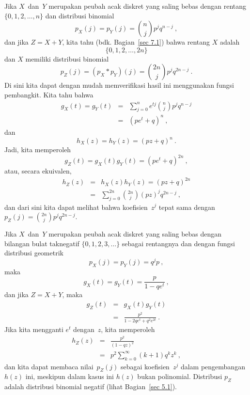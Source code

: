 \begin{example}\label{exam 10.5}
Jika $X$~dan~$Y$ merupakan peubah acak diskret yang saling bebas dengan rentang
$\{0,1,2,\ldots,n\}$ dan distribusi binomial
$$
p_X(j) = p_Y(j) = {n \choose j} p^j q^{n - j}\ ,
$$
dan jika $Z = X + Y$, kita tahu (bdk. Bagian~\ref{sec 7.1}) bahwa rentang $X$ adalah
$$\{0,1,2,\ldots,2n\}$$ 
dan $X$ memiliki distribusi binomial
$$
p_Z(j) = (p_X * p_Y)(j) =
{2n \choose j} p^j q^{2n - j}\ .
$$
Di sini kita dapat dengan mudah memverifikasi hasil ini menggunakan fungsi pembangkit.  Kita tahu
bahwa
\begin{eqnarray*}
g_X(t) = g_Y(t) &=& \sum_{j = 0}^n e^{tj} {n \choose j} p^j q^{n - j} \\
       &=& (pe^t + q)^n\ ,
\end{eqnarray*}
dan
$$
h_X(z) = h_Y(z) = (pz + q)^n\ .
$$
Jadi, kita memperoleh
$$
g_Z(t) = g_X(t) g_Y(t) = (pe^t + q)^{2n}\ ,
$$
atau, secara ekuivalen,
\begin{eqnarray*}
h_Z(z) &=& h_X(z) h_Y(z) = (pz + q)^{2n} \\
       &=& \sum_{j = 0}^{2n} {2n \choose j} (pz)^j q^{2n - j}\ ,
\end{eqnarray*}
dan dari sini kita dapat melihat bahwa koefisien~$z^j$ tepat sama dengan $p_Z(j) =
{2n \choose j} p^j q^{2n - j}$.
\end{example}

\begin{example}\label{exam 10.6}
Jika $X$~dan~$Y$ merupakan peubah acak diskret yang saling bebas dengan bilangan bulat 
taknegatif $\{0,1,2,3,\ldots\}$ sebagai rentangnya dan dengan fungsi distribusi geometrik 
$$p_X(j) = p_Y(j) = q^j p\ ,$$ 
maka
$$
g_X(t) = g_Y(t) = \frac p{1 - qe^t}\ ,
$$
dan jika $Z = X + Y$, maka
\begin{eqnarray*}
g_Z(t) &=& g_X(t) g_Y(t) \\
       &=& \frac{p^2}{1 - 2qe^t + q^2 e^{2t}}\ .
\end{eqnarray*}
Jika kita mengganti $e^t$ dengan~$z$, kita memperoleh
\begin{eqnarray*}
h_Z(z) &=& \frac{p^2}{(1 - qz)^2} \\
       &=& p^2 \sum_{k = 0}^\infty (k + 1) q^k z^k\ ,
\end{eqnarray*}
dan kita dapat membaca nilai~$p_Z(j)$ sebagai koefisien~$z^j$ dalam
pengembangan $h(z)$ ini, meskipun dalam kasus ini $h(z)$ bukan polinomial.  Distribusi
$p_Z$ adalah distribusi binomial negatif (lihat 
Bagian~\ref{sec 5.1}).
\end{example}

